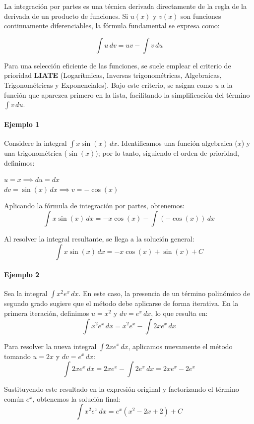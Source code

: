 \documentclass[12pt]{article}
\begin{document}
La integración por partes es una técnica derivada directamente de la regla de la derivada de un producto de funciones. Si $u(x)$ y $v(x)$ son funciones continuamente diferenciables, la fórmula fundamental se expresa como:

\[
\int u \, dv = uv - \int v \, du
\]

Para una selección eficiente de las funciones, se suele emplear el criterio de prioridad \textbf{LIATE} (Logarítmicas, Inversas trigonométricas, Algebraicas, Trigonométricas y Exponenciales). Bajo este criterio, se asigna como $u$ a la función que aparezca primero en la lista, facilitando la simplificación del término $\int v \, du$.

\paragraph{Ejemplo 1}
Considere la integral $\int x \sin(x) \, dx$. Identificamos una función algebraica ($x$) y una trigonométrica ($\sin(x)$); por lo tanto, siguiendo el orden de prioridad, definimos:
\begin{center}
    $u = x \implies du = dx$ \\
    $dv = \sin(x) \, dx \implies v = -\cos(x)$
\end{center}

Aplicando la fórmula de integración por partes, obtenemos:
\[
\int x \sin(x) \, dx = -x \cos(x) - \int (-\cos(x)) \, dx
\]

Al resolver la integral resultante, se llega a la solución general:
\[
\int x \sin(x) \, dx = -x \cos(x) + \sin(x) + C
\]

\paragraph{Ejemplo 2}
Sea la integral $\int x^2 e^x \, dx$. En este caso, la presencia de un término polinómico de segundo grado sugiere que el método debe aplicarse de forma iterativa. En la primera iteración, definimos $u = x^2$ y $dv = e^x \, dx$, lo que resulta en:
\[
\int x^2 e^x \, dx = x^2 e^x - \int 2x e^x \, dx
\]

Para resolver la nueva integral $\int 2x e^x \, dx$, aplicamos nuevamente el método tomando $u = 2x$ y $dv = e^x \, dx$:
\[
\int 2x e^x \, dx = 2x e^x - \int 2 e^x \, dx = 2x e^x - 2e^x
\]

Sustituyendo este resultado en la expresión original y factorizando el término común $e^x$, obtenemos la solución final:
\[
\int x^2 e^x \, dx = e^x (x^2 - 2x + 2) + C
\]
\end{document}
